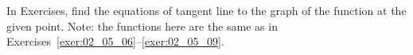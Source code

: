 \begin{exerciseset}{In Exercises}{, find the equations of tangent %
line to the graph of the function at the given point. Note: the functions here are the same as in Exercises~\ref{exer:02_05_06}--\ref{exer:02_05_09}.}





\end{exerciseset}
